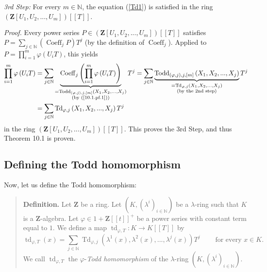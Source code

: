 \documentclass[numbers=enddot,12pt,final,onecolumn,notitlepage]{scrartcl}%
\begin{document}
\textit{3rd Step:} For every $m\in\mathbb{N}$, the equation (\ref{Td1}) is
satisfied in the ring $\left(  \mathbf{Z}\left[  U_{1},U_{2},...,U_{m}\right]
\right)  \left[  \left[  T\right]  \right]  $.

\textit{Proof.} Every power series $P\in\left(  \mathbf{Z}\left[  U_{1}%
,U_{2},...,U_{m}\right]  \right)  \left[  \left[  T\right]  \right]  $
satisfies $P=\sum\limits_{j\in\mathbb{N}}\left(  \operatorname*{Coeff}%
\nolimits_{j}P\right)  T^{j}$ (by the definition of $\operatorname*{Coeff}%
\nolimits_{j}$). Applied to $P=\prod\limits_{i=1}^{m}\varphi\left(
U_{i}T\right)  $, this yields%
\begin{align*}
\prod\limits_{i=1}^{m}\varphi\left(  U_{i}T\right)   &  =\sum\limits_{j\in
\mathbb{N}}\underbrace{\operatorname*{Coeff}\nolimits_{j}\left(
\prod\limits_{i=1}^{m}\varphi\left(  U_{i}T\right)  \right)  }%
_{\substack{=\operatorname*{Todd}\nolimits_{\left(  \varphi,j\right)
,j,\left[  m\right]  }\left(  X_{1},X_{2},...,X_{j}\right)  \\\text{(by
(\ref{10.1.pf.1}))}}}T^{j}=\sum\limits_{j\in\mathbb{N}}%
\underbrace{\operatorname*{Todd}\nolimits_{\left(  \varphi,j\right)
,j,\left[  m\right]  }\left(  X_{1},X_{2},...,X_{j}\right)  }%
_{\substack{=\operatorname*{Td}\nolimits_{\varphi,j}\left(  X_{1}%
,X_{2},...,X_{j}\right)  \\\text{(by the 2nd step)}}}T^{j}\\
&  =\sum\limits_{j\in\mathbb{N}}\operatorname*{Td}\nolimits_{\varphi,j}\left(
X_{1},X_{2},...,X_{j}\right)  T^{j}%
\end{align*}
in the ring $\left(  \mathbf{Z}\left[  U_{1},U_{2},...,U_{m}\right]  \right)
\left[  \left[  T\right]  \right]  $. This proves the 3rd Step, and thus
Theorem 10.1 is proven.

\subsection{Defining the Todd homomorphism}

Now, let us define the Todd homomorphism:

\begin{quote}
\textbf{Definition.} Let $\mathbf{Z}$ be a ring. Let $\left(  K,\left(
\lambda^{i}\right)  _{i\in\mathbb{N}}\right)  $ be a $\lambda$-ring such that
$K$ is a $\mathbf{Z}$-algebra. Let $\varphi\in1+\mathbf{Z}\left[  \left[
t\right]  \right]  ^{+}$ be a power series with constant term equal to $1$. We
define a map $\operatorname*{td}_{\varphi,T}:K\rightarrow K\left[  \left[
T\right]  \right]  $ by%
\begin{equation}
\operatorname*{td}\nolimits_{\varphi,T}\left(  x\right)  =\sum\limits_{j\in
\mathbb{N}}\operatorname*{Td}\nolimits_{\varphi,j}\left(  \lambda^{1}\left(
x\right)  ,\lambda^{2}\left(  x\right)  ,...,\lambda^{j}\left(  x\right)
\right)  T^{j}\ \ \ \ \ \ \ \ \ \ \text{for every }x\in K. \label{ToddDef}%
\end{equation}
We call $\operatorname*{td}\nolimits_{\varphi,T}$ the $\varphi$-\textit{Todd
homomorphism} of the $\lambda$-ring $\left(  K,\left(  \lambda^{i}\right)
_{i\in\mathbb{N}}\right)  $.
\end{quote}
\end{document}
